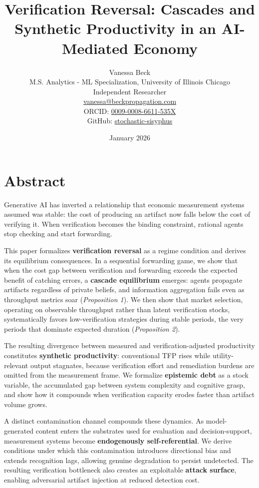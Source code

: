 \documentclass[11pt,a4paper]{article}
\title{Verification Reversal: Cascades and Synthetic Productivity in an AI-Mediated Economy}
\author{Vanessa Beck\\
M.S. Analytics - ML Specialization, University of Illinois Chicago\\
Independent Researcher\\
\href{mailto:vanessa@beckpropagation.com}{vanessa@beckpropagation.com}\\[0.5em]
ORCID: \href{https://orcid.org/0009-0008-6611-535X}{0009-0008-6611-535X}\\
GitHub: \href{https://github.com/stochastic-sisyphus}{stochastic-sisyphus}}
\date{January 2026}
\begin{document}
\maketitle

\hypertarget{abstract}{%
\section*{Abstract}\label{abstract}}

Generative AI has inverted a relationship that economic measurement systems assumed was stable: the cost of producing an artifact now falls below the cost of verifying it. When verification becomes the binding constraint, rational agents stop checking and start forwarding.

This paper formalizes \textbf{verification reversal} as a regime condition and derives its equilibrium consequences. In a sequential forwarding game, we show that when the cost gap between verification and forwarding exceeds the expected benefit of catching errors, a \textbf{cascade equilibrium} emerges: agents propagate artifacts regardless of private beliefs, and information aggregation fails even as throughput metrics soar (\emph{Proposition 1}). We then show that market selection, operating on observable throughput rather than latent verification stocks, systematically favors low-verification strategies during stable periods, the very periods that dominate expected duration (\emph{Proposition 2}).

The resulting divergence between measured and verification-adjusted productivity constitutes \textbf{synthetic productivity}: conventional TFP rises while utility-relevant output stagnates, because verification effort and remediation burdens are omitted from the measurement frame. We formalize \textbf{epistemic debt} as a stock variable, the accumulated gap between system complexity and cognitive grasp, and show how it compounds when verification capacity erodes faster than artifact volume grows.

A distinct contamination channel compounds these dynamics. As model-generated content enters the substrates used for evaluation and decision-support, measurement systems become \textbf{endogenously self-referential}. We derive conditions under which this contamination introduces directional bias and extends recognition lags, allowing genuine degradation to persist undetected. The resulting verification bottleneck also creates an exploitable \textbf{attack surface}, enabling adversarial artifact injection at reduced detection cost.
\end{document}
